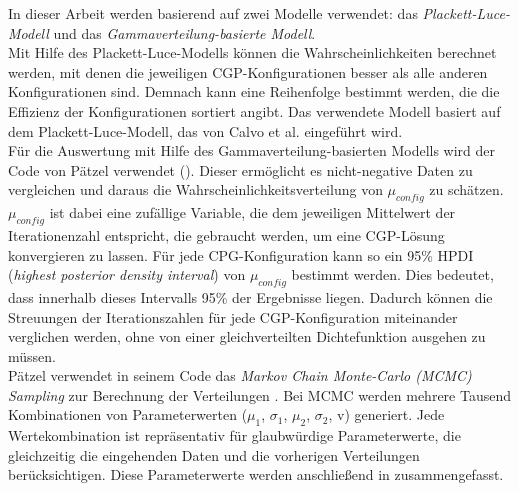 In dieser Arbeit werden basierend auf \cite{cui_equidistant_2023} zwei Modelle verwendet: das \emph{Plackett-Luce-Modell} und das \emph{Gammaverteilung-basierte Modell}.\\
Mit Hilfe des Plackett-Luce-Modells können die Wahrscheinlichkeiten berechnet werden, mit denen die jeweiligen CGP-Konfigurationen besser als alle anderen Konfigurationen sind.
Demnach kann eine Reihenfolge bestimmt werden, die die Effizienz der Konfigurationen sortiert angibt.
Das verwendete Modell basiert auf dem Plackett-Luce-Modell, das von Calvo et al. eingeführt wird. \cite{cui_equidistant_2023, calvo_plackett_luce}\\
Für die Auswertung mit Hilfe des Gammaverteilung-basierten Modells wird der Code von Pätzel verwendet (\cite{patzel_dpaetzelcmpbayes_2024}). 
Dieser ermöglicht es nicht-negative Daten zu vergleichen und daraus die Wahrscheinlichkeitsverteilung von $\mu_{config}$ zu schätzen.
$\mu_{config}$ ist dabei eine zufällige Variable, die dem jeweiligen Mittelwert der Iterationenzahl entspricht, die gebraucht werden, um eine CGP-Lösung konvergieren zu lassen.
Für jede CPG-Konfiguration kann so ein 95\% HPDI (\emph{highest posterior density interval}) von $\mu_{config}$ bestimmt werden.
Dies bedeutet, dass innerhalb dieses Intervalls 95\% der Ergebnisse liegen. \cite{cui_equidistant_2023}
Dadurch können die Streuungen der Iterationszahlen für jede CGP-Konfiguration miteinander verglichen werden, ohne von einer gleichverteilten Dichtefunktion ausgehen zu müssen.\\

Pätzel verwendet in seinem Code das \emph{Markov Chain Monte-Carlo (MCMC) Sampling} zur Berechnung der Verteilungen \cite{patzel_dpaetzelcmpbayes_2024, cui_equidistant_2023}.
Bei MCMC werden mehrere Tausend Kombinationen von Parameterwerten ($\mu_1$, $\sigma_1$, $\mu_2$, $\sigma_2$, v) generiert.
Jede Wertekombination ist repräsentativ für glaubwürdige Parameterwerte, die gleichzeitig die eingehenden Daten und die vorherigen Verteilungen berücksichtigen.
Diese Parameterwerte werden anschließend in zusammengefasst. \cite{kruschke_bayesian_estimation}

